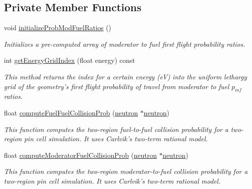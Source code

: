 \subsection*{Private Member Functions}
\begin{DoxyCompactItemize}
\item 
void \hyperlink{classGeometry_a8cff9ffc1cdeff81b79b1be44bc07727}{initialize\-Prob\-Mod\-Fuel\-Ratios} ()
\begin{DoxyCompactList}\small\item\em Initializes a pre-\/computed array of moderator to fuel first flight probability ratios. \end{DoxyCompactList}\item 
int \hyperlink{classGeometry_a83068853767cd0ac581250f7e2e38981}{get\-Energy\-Grid\-Index} (float energy) const 
\begin{DoxyCompactList}\small\item\em This method returns the index for a certain energy (e\-V) into the uniform lethargy grid of the geometry's first flight probability of travel from moderator to fuel $ p_{mf} $ ratios. \end{DoxyCompactList}\item 
float \hyperlink{classGeometry_aee0db385712e2bc3800028159d61d1ab}{compute\-Fuel\-Fuel\-Collision\-Prob} (\hyperlink{structneutron}{neutron} $\ast$\hyperlink{structneutron}{neutron})
\begin{DoxyCompactList}\small\item\em This function computes the two-\/region fuel-\/to-\/fuel collision probability for a two-\/region pin cell simulation. It uses Carlvik's two-\/term rational model. \end{DoxyCompactList}\item 
float \hyperlink{classGeometry_a1d6e3070b59ce33b1c25d04635889dfb}{compute\-Moderator\-Fuel\-Collision\-Prob} (\hyperlink{structneutron}{neutron} $\ast$\hyperlink{structneutron}{neutron})
\begin{DoxyCompactList}\small\item\em This function computes the two-\/region moderator-\/to-\/fuel collision probability for a two-\/region pin cell simulation. It uses Carlvik's two-\/term rational model. \end{DoxyCompactList}\end{DoxyCompactItemize}
